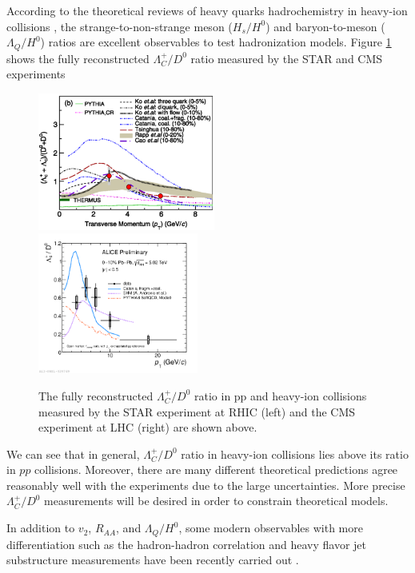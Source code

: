 According to the theoretical reviews of heavy quarks hadrochemistry in heavy-ion collisions \cite{StrangetoLight,BaryontoMeson}, the strange-to-non-strange meson ($H_s/H^0$) and baryon-to-meson ($\Lambda_{Q}/H^{0}$) ratios are excellent observables to test hadronization models. Figure \ref{HadroPlotCharm} shows the fully reconstructed $\Lambda_C^+/D^0$ ratio measured by the STAR and CMS experiments

\begin{figure}[hbtp]
\begin{center}
\includegraphics[width=0.52\textwidth]{Figures/Chapter1/STARLambdaCD0.png}
\includegraphics[width=0.47\textwidth]{Figures/Chapter1/ALICELambdaCD0}
\caption{The fully reconstructed $\Lambda_C^+/D^0$ ratio in pp and heavy-ion collisions measured by the STAR experiment at RHIC (left) and the CMS experiment at LHC (right) are shown above.}
\label{HadroPlotCharm}
\end{center}
\end{figure}   

We can see that in general, $\Lambda_C^+/D^0$ ratio in heavy-ion collisions lies above its ratio in $pp$ collisions. Moreover, there are many different theoretical predictions agree reasonably well with the experiments due to the large uncertainties. More precise $\Lambda_C^+/D^0$ measurements will be desired in order to constrain theoretical models.

In addition to $v_2$, $R_{AA}$, and $\Lambda_{Q}/H^{0}$, some modern observables with more differentiation such as the hadron-hadron correlation and heavy flavor jet substructure measurements have been recently carried out \cite{DDbar,DJet}. 

